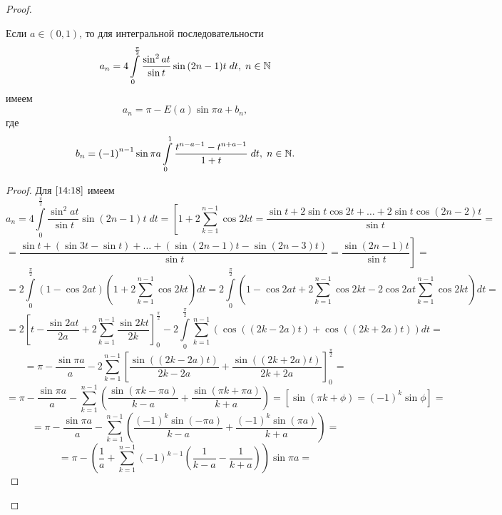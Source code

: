 \documentclass[../../main.tex]{subfiles}
\begin{document}
\begin{proof}
		\begin{lemma}
			Если $a \in (0,1)$, то для интегральной последовательности
			\begin{equation}
			\label{14:18}
			a_n = 4 \int\limits_{0}^{\frac{\pi}{2}} \frac{\sin^2{at}}{\sin{t}} 
			\sin{(2n-1)t} \; dt, \; n \in \mathbb{N}
			\end{equation}
			имеем
			\begin{equation}
			\label{14:19}
			a_n = \pi - E(a) \sin{\pi a} + b_n,
			\end{equation}
			где
			\begin{equation}
			\label{14:20}
			b_n = \left( - 1 \right)^{n-1} \sin{\pi a} \int\limits_{0}^{1}
			\frac{t^{n-a-1} - t^{n+a-1} }{1+t} \; dt, \; n \in \mathbb{N}.
			\end{equation}
		\end{lemma}	
			\begin{proof}
				Для $\eqref{14:18}$ имеем
				\[   a_n =  4\int\limits_{0}^{\frac{\pi}{2}} \frac{\sin^2{at}}{\sin{t}} 
				\sin{(2n-1)t} \; dt = \left[ 1 + 2\sum^{n-1}_{k = 1} \cos{2k t} 
				= \frac{\sin{t} + 2 \sin{t} \cos{2t} + \dots + 2\sin{t} \cos{(2n - 
				2)t}}{\sin{t}} \right. = \]
				\[ = \left. \frac{\sin{t} + \left( \sin{3t} - \sin{t} \right) + \dots 
				+\left( \sin{(2n-1)t} - \sin{(2n-3)t} \right) }{\sin{t}} = 
				\frac{\sin{(2n-1)t}}{\sin{t}} \right] = \]
				\[ = 2 \int\limits_{0}^{\frac{\pi}{2}} \left( 1-\cos{2at}\right) \left( 1 
				+ 2 \sum^{n-1}_{k = 1} \cos{2k t} \right) dt  = 
				2\int\limits_{0}^{\frac{\pi}{2}} \left( 1-\cos{2at} + 2 \sum^{n-1}_{k = 1} 
				\cos{2k t} - 2 \cos{2at} \sum^{n-1}_{k = 1} \cos{2k t}\right) dt = \]
				\[  = 2 \left[ t - \frac{\sin{2at}}{2a} + 2 
				\sum_{k=1}^{n-1}\frac{\sin{2kt}}{2k} \right]_{0}^{\frac{\pi}{2}} - 2 
				\int\limits_{0}^{\frac{\pi}{2}} \sum_{k=1}^{n-1} \left( \cos((2k-2a)t) + 
				\cos((2k+2a)t) \right) dt = \]
				\[  = \pi - \frac{\sin{\pi a}}{a} - 2 \sum_{k=1}^{n-1} \left[ 
				\frac{\sin((2k-2a)t)}{2k-2a} + \frac{\sin((2k+2a)t)}{2k+2a} 
				\right]_{0}^{\frac{\pi}{2}} = \]
				\[    = \pi - \frac{\sin{\pi a}}{a} -  \sum_{k=1}^{n-1} \left( 
				\frac{\sin{(\pi k- \pi a)}}{k-a} + \frac{\sin{(\pi k+ \pi a)}}{k+a} 
				\right) = \left[ \sin{(\pi k + \phi) = \left( -1\right)^k \sin{\phi}} 
				\right] = \]
				\[  = \pi - \frac{\sin{\pi a}}{a} - \sum_{k=1}^{n-1} \left( \frac{(-1)^k 
				\sin{(- \pi a)}}{k-a} + \frac{(-1)^k \sin{(\pi a)}}{k+a} \right)  =        
				  \]
				\[ = \pi -\left(  \frac{1}{a} + \sum_{k=1}^{n-1} (-1)^{k-1} \left( 
				\frac{1}{k-a} - \frac{1}{k+a} \right)    \right) \sin{\pi a} = 
\]
\end{proof}
\end{proof}
\end{document}
